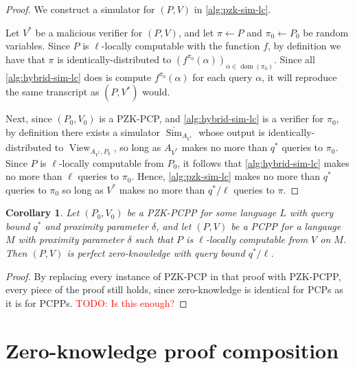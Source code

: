 \documentclass[english,12pt]{reedthesis}
\theoremstyle{plain}
\newtheorem{cor}[cor]{Corollary}
\theoremstyle{definition}
\theoremstyle{remark}
\DeclareMathOperator{\dom}{dom}
\DeclareMathOperator{\Sim}{Sim}
\DeclareMathOperator{\View}{View}
\newcommand{\TODO}[1]{\textcolor{red}{TODO: #1}}
\begin{document}
\begin{proof}
  We construct a simulator for $(P, V)$ in \cref{alg:pzk-sim-lc}.

  Let $V^{*}$ be a malicious verifier for $(P, V)$, and let $\pi \leftarrow P$ and
  $\pi_{0} \leftarrow P_{0}$ be random variables. Since $P$ is $\ell$-locally computable with
  the function $f$, by definition we have that $\pi$ is identically-distributed to
  $(f^{\pi_{0}}(\alpha))_{\alpha \in \dom(\pi_{0})}$.
  Since all \cref{alg:hybrid-sim-lc} does is compute $f^{\pi_{0}}(\alpha)$ for each
  query $\alpha$, it will reproduce the same transcript as $(P, V^{*})$ would.

  Next, since $(P_{0}, V_{0})$ is a PZK-PCP, and \cref{alg:hybrid-sim-lc} is a
  verifier for $\pi_{0}$, by definition there exists a simulator
  $\overline{\Sim}_{A_{V^{*}}}$ whose output is identically-distributed to
  $\View_{A_{V^{*}}, P_{0}}$, so long as $A_{V^{*}}$ makes no more than $q^{*}$
  queries to $\pi_{0}$. Since $P$ is $\ell$-locally computable from $P_{0}$, it
  follows that \cref{alg:hybrid-sim-lc} makes no more than $\ell$ queries to
  $\pi_{0}$. Hence, \cref{alg:pzk-sim-lc} makes no more than $q^{*}$ queries to
  $\pi_{0}$ so long as $V^{*}$ makes no more than $q^{*}/\ell$ queries to $\pi$.
\end{proof}

\begin{cor}\label{cor:local-comp-pzk}
  Let $(P_{0}, V_{0})$ be a PZK-PCPP for some language $L$ with query bound
  $q^{*}$ and proximity parameter $\delta$, and let $(P, V)$ be a PCPP for a langauge
  $M$ with proximity parameter $\delta$ such that $P$ is $\ell$-locally computable
  from $V$ on $M$. Then $(P, V)$ is perfect zero-knowledge with query bound
  $q^{*}/\ell$.
\end{cor}

\begin{proof}
  By replacing every instance of PZK-PCP in that proof with PZK-PCPP, every
  piece of the proof still holds, since zero-knowledge is identical for PCPs as
  it is for PCPPs. \TODO{Is this enough?}
\end{proof}

\section{Zero-knowledge proof composition}\label{sec:zk-proof-comp}
\end{document}
